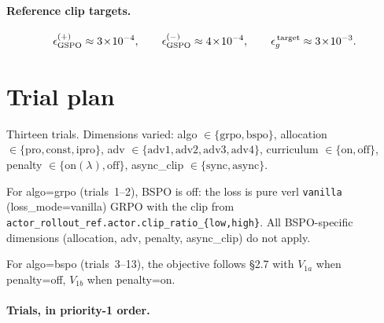 \documentclass[11pt]{article}
\begin{document}
\paragraph{Reference clip targets.}
\[
\epsilon_{\rm GSPO}^{(+)} \approx 3\!\times\!10^{-4},\qquad
\epsilon_{\rm GSPO}^{(-)} \approx 4\!\times\!10^{-4},\qquad
\epsilon_g^{\,\text{target}} \approx 3\!\times\!10^{-3}.
\]

\section{Trial plan}

Thirteen trials. Dimensions varied: \textsf{algo}
$\in\{\text{grpo}, \text{bspo}\}$, \textsf{allocation}
$\in\{\text{pro}, \text{const}, \text{ipro}\}$,
\textsf{adv} $\in\{\text{adv1}, \text{adv2}, \text{adv3}, \text{adv4}\}$,
\textsf{curriculum} $\in\{\text{on}, \text{off}\}$,
\textsf{penalty} $\in\{\text{on}(\lambda), \text{off}\}$,
\textsf{async\_clip} $\in\{\text{sync}, \text{async}\}$.

For \textsf{algo}=grpo (trials~1--2), BSPO is off: the loss is pure
verl \texttt{vanilla} (loss\_mode=vanilla) GRPO with the clip from
\texttt{actor\_rollout\_ref.actor.clip\_ratio\_\{low,high\}}. All
BSPO-specific dimensions (allocation, adv, penalty, async\_clip)
do not apply.

For \textsf{algo}=bspo (trials~3--13), the objective follows
\S2.7 with $V_{1a}$ when \textsf{penalty}=off, $V_{1b}$ when
\textsf{penalty}=on.

\paragraph{Trials, in priority-1 order.}
\end{document}
